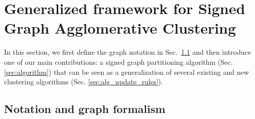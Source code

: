 
\section{Generalized framework for Signed Graph Agglomerative Clustering} \label{sec:general_framework}
In this section, we first define the graph notation in Sec.~\ref{sec:notation} and then introduce one of our main contributions: a signed graph partitioning algorithm (Sec. \ref{sec:algorithm}) that can be seen as a generalization of several existing and new clustering algorithms (Sec. \ref{sec:alg_update_rules}).

\subsection{Notation and graph formalism} \label{sec:notation}

